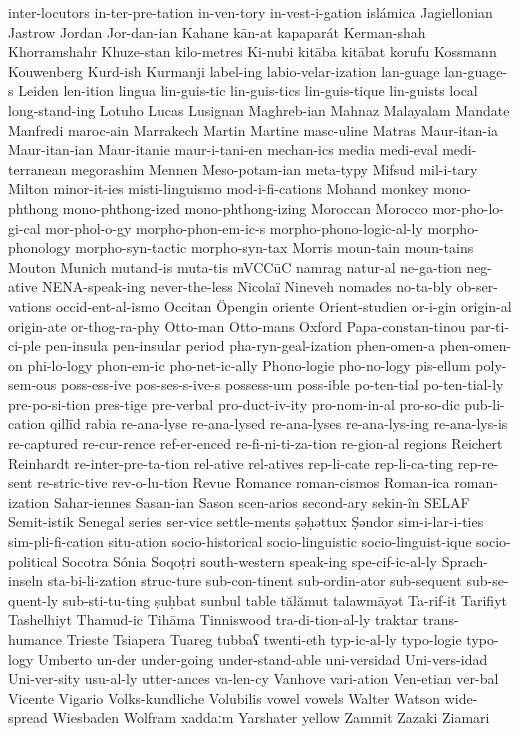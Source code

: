 {inter-locutors
in-ter-pre-tation
in-ven-tory
in-vest-i-gation
islámica
Jagiellonian
Jastrow
Jordan
Jor-dan-ian
Kahane
kān-at
kapaparát
Kerman-shah
Khorramshahr
Khuze-stan
kilo-metres
Ki-nubi
kitāba
kitābat
korufu
Kossmann
Kouwenberg
Kurd-ish
Kurmanji
label-ing
labio-velar-ization
lan-guage
lan-guage-s
Leiden
len-ition
lingua
lin-guis-tic
lin-guis-tics
lin-guis-tique
lin-guists
local
long-stand-ing
Lotuho
Lucas
Lusignan
Maghreb-ian
Mahnaz
Malayalam
Mandate
Manfredi
maroc-ain
Marrakech
Martin
Martine
masc-uline
Matras
Maur-itan-ia
Maur-itan-ian
Maur-itanie
maur-i-tani-en
mechan-ics
media
medi-eval
medi-terranean
megorashim
Mennen
Meso-potam-ian
meta-typy
Mifsud
mil-i-tary
Milton
minor-it-ies
misti-linguismo
mod-i-fi-cations
Mohand
monkey
mono-phthong
mono-phthong-ized
mono-phthong-izing
Moroccan
Morocco
mor-pho-lo-gi-cal
mor-phol-o-gy
morpho-phon-em-ic-s
morpho-phono-logic-al-ly
morpho-phonology
morpho-syn-tactic
morpho-syn-tax
Morris
moun-tain
moun-tains
Mouton
Munich
mutand-is
muta-tis
mVCCūC
namrag
natur-al
ne-ga-tion
neg-ative
NENA-speak-ing
never-the-less
Nicolaï
Nineveh
nomades
no-ta-bly
ob-ser-vations
occid-ent-al-ismo
Occitan
Öpengin
oriente
Orient-studien
or-i-gin
origin-al
origin-ate
or-thog-ra-phy
Otto-man
Otto-mans
Oxford
Papa-constan-tinou
par-ti-ci-ple
pen-insula
pen-insular
period
pha-ryn-geal-ization
phen-omen-a
phen-omen-on
phi-lo-logy
phon-em-ic
pho-net-ic-ally
Phono-logie
pho-no-logy
pis-ellum
poly-sem-ous
poss-ess-ive
pos-ses-s-ive-s
possess-um
poss-ible
po-ten-tial
po-ten-tial-ly
pre-po-si-tion
pres-tige
pre-verbal
pro-duct-iv-ity
pro-nom-in-al
pro-so-dic
pub-li-cation
qillīd
rabia
re-ana-lyse
re-ana-lysed
re-ana-lyses
re-ana-lys-ing
re-ana-lys-is
re-captured
re-cur-rence
ref-er-enced
re-fi-ni-ti-za-tion
re-gion-al
regions
Reichert
Reinhardt
re-inter-pre-ta-tion
rel-ative
rel-atives
rep-li-cate
rep-li-ca-ting
rep-re-sent
re-stric-tive
rev-o-lu-tion
Revue
Romance
roman-cismos
Roman-ica
roman-ization
Sahar-iennes
Sasan-ian
Sason
scen-arios
second-ary
sekin-în
SELAF
Semit-istik
Senegal
series
ser-vice
settle-ments
ṣəḥəttux
Ṣəndor
sim-i-lar-i-ties
sim-pli-fi-cation
situ-ation
socio-historical
socio-linguistic
socio-linguist-ique
socio-political
Socotra
Sónia
Soqoṭri
south-western
speak-ing
spe-cif-ic-al-ly
Sprach-inseln
sta-bi-li-zation
struc-ture
sub-con-tinent
sub-ordin-ator
sub-sequent
sub-se-quent-ly
sub-sti-tu-ting
ṣuḥbat
sunbul
table
tălămut
talawmāyət
Ta-rif-it
Tarifiyt
Tashelhiyt
Thamud-ic
Tihāma
Tinniswood
tra-di-tion-al-ly
traktar
trans-humance
Trieste
Tsiapera
Tuareg
tubbaʕ
twenti-eth
typ-ic-al-ly
typo-logie
typo-logy
Umberto
un-der
under-going
under-stand-able
uni-versidad
Uni-vers-idad
Uni-ver-sity
usu-al-ly
utter-ances
va-len-cy
Vanhove
vari-ation
Ven-etian
ver-bal
Vicente
Vigario
Volks-kundliche
Volubilis
vowel
vowels
Walter
Watson
wide-spread
Wiesbaden
Wolfram
xaddaːm
Yarshater
yellow
Zammit
Zazaki
Ziamari
}

